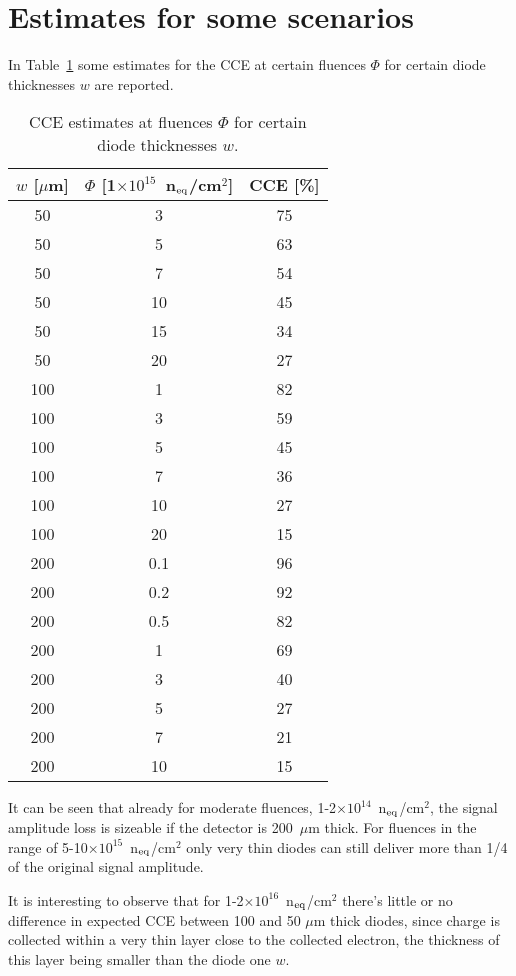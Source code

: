 \section{Estimates for some scenarios}

In Table~\ref{tab:cce_scenarios} some estimates for the CCE at certain fluences $\Phi$ for 
certain diode thicknesses $w$ are reported.

\begin{table}[!htbp]
\centering
\begin{tabular}{ccc}
\hline
$w$ [$\mu$m] & $\Phi$ [1$\times10^{15}$~n$_{\rm eq}$/cm$^2$] & CCE [\%] \\
\hline
\hline
50 & 3 & 75 \\
50 & 5 & 	63 \\
50 & 7 & 54 \\
50 & 	10 & 	45 \\
50 & 15 & 34 \\
50 & 20 & 27\\
\hline
100 & 1 & 82 \\
100 & 3 & 59 \\
100 & 5 & 	45 \\
100 & 7 & 36 \\
100 & 10 & 27 \\
100 & 20 & 15 \\
\hline
200 & 0.1 & 96\\
200 & 0.2 & 92\\
200 & 0.5 & 82\\
200 & 1 & 69 \\
200 & 3 & 40 \\
200 & 5 & 	27 \\
200 & 7 & 21 \\
200 & 10 & 15 \\
\hline
\end{tabular}
\caption{\label{tab:cce_scenarios}CCE estimates at fluences $\Phi$ for 
certain diode thicknesses $w$.}
\end{table}

It can be seen that already for moderate fluences, 1-2$\times10^{14}$~n$_{\rm eq}$/cm$^2$, 
the signal amplitude loss is sizeable if the detector is 200~$\mu$m thick. 
For fluences in the range of 5-10$\times10^{15}$~n$_{\rm eq}$/cm$^2$ only very thin diodes 
can still deliver more than 1/4 of the original signal amplitude. 

It is interesting to observe that for 1-2$\times10^{16}$~n$_{\rm eq}$/cm$^2$ there's little or no 
difference in expected CCE between 100 and 50 $\mu$m thick diodes, since charge is collected 
within a very thin layer close to the collected electron, the thickness of this layer being smaller 
than the diode one $w$.

